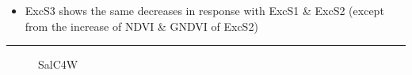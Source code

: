 \documentclass{article}
\begin{document}
{\begin{landscape}
                    \begin{itemize}
                       \item ExcS3 shows the same decreases in response with ExcS1 & ExcS2 (except from the increase of NDVI & GNDVI of ExcS2)
                    \end{itemize}
                    \newpage
                    \vspace*{-3.8\baselineskip}
                    \hrule
                    \vspace*{3\baselineskip}
                    
                    \begin{figure}[h]
                        \centering
                        \qquad
                        \caption{SalC4W}%
                        \label{fig:example}
                    \end{figure}
                    \vspace*{2\baselineskip}
                    

\end{landscape}}
\end{document}
